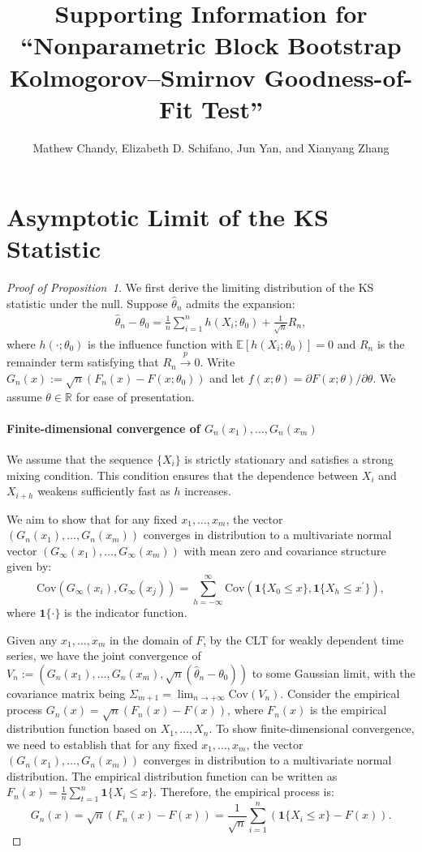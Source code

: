 \documentclass[12pt]{article}
\title{Supporting Information for
  ``Nonparametric Block Bootstrap Kolmogorov--Smirnov Goodness-of-Fit
  Test''}
\author{Mathew Chandy, Elizabeth D. Schifano, Jun Yan, and Xianyang
  Zhang}
\begin{document}
\maketitle


\section{Asymptotic Limit of the KS Statistic}

\begin{proof}[Proof of Proposition~1]
We first derive the limiting distribution of the KS statistic under the null. 
Suppose $\hat{\theta}_n$ admits the expansion:
\begin{align}\label{eq-expan}
\hat{\theta}_n-\theta_0 = \frac{1}{n}\sum^{n}_{i=1}h(X_i;\theta_0) + 
\frac{1}{\sqrt{n}}R_n,    
\end{align}
where $h(\cdot;\theta_0)$ is the influence function with 
$\mathbb{E}[h(X_i;\theta_0)]=0$ and $R_n$ is the remainder term satisfying that
$R_n\overset{p}{\rightarrow} 0.$ Write $G_n(x):=\sqrt{n}(F_n(x) - 
F(x; \theta_0))$ 
and let $f(x;\theta)=\partial F(x;\theta)/\partial \theta$. We assume 
$\theta \in \mathbb{R}$ for ease of presentation.

\paragraph{Finite-dimensional convergence of $G_n(x_1),\dots,G_n(x_m)$}

We assume that the sequence \(\{X_i\}\) is strictly stationary and satisfies a 
strong mixing condition. This condition ensures that the dependence between 
\(X_i\) and \(X_{i+h}\) weakens sufficiently fast as \(h\) increases.


We aim to show that for any fixed \( x_1, \ldots, x_m \), the vector
\( (G_n(x_1), \ldots, G_n(x_m)) \) converges in distribution to a
multivariate normal vector \( (G_{\infty}(x_1), \ldots,
G_{\infty}(x_m)) \) with mean zero and covariance structure given by:
\[
\text{Cov}(G_{\infty}(x_i), G_{\infty}(x_j)) = \sum_{h=-\infty}^{\infty} \text{Cov}(\mathbf{1}\{X_0 \leq x\}, \mathbf{1}\{X_h \leq x^{\prime}\}),
\]
where $ \mathbf{1}\{\cdot\}$ is the indicator
function.


Given any $x_1,\dots,x_m$ in the domain of $F$, by the CLT for weakly dependent 
time series, we have the joint convergence of 
$V_n:=(G_n(x_1),\dots,G_n(x_m),\sqrt{n}(\hat{\theta}_n-\theta_0))$
to some Gaussian limit, with the covariance matrix being 
$\Sigma_{m+1}=\lim_{n\rightarrow+\infty}\text{Cov}(V_n)$.
Consider the empirical process $ G_n(x) = \sqrt{n} (F_n(x) - F(x)) $, where 
$ F_n(x) $ is the empirical distribution function based on $ X_1, \ldots, 
X_n $. To show finite-dimensional convergence, we need to establish that for 
any fixed $ x_1, \ldots, x_m $, the vector $ (G_n(x_1), \ldots, G_n(x_m)) $ 
converges in distribution to a multivariate normal distribution.
The empirical distribution function can be written as
$
F_n(x) = \frac{1}{n} \sum_{t=1}^n \mathbf{1}\{X_i \leq x\}.
$
Therefore, the empirical process is:
\[
G_n(x) = \sqrt{n} (F_n(x) - F(x)) = \frac{1}{\sqrt{n}} \sum_{i=1}^n 
(\mathbf{1}\{X_i \leq x\} - F(x)).
\]



\end{proof}
\end{document}
